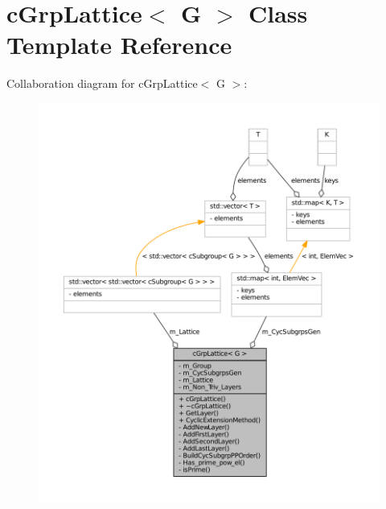 \hypertarget{classcGrpLattice}{
\section{c\-Grp\-Lattice$<$ \-G $>$ \-Class \-Template \-Reference}
\label{classcGrpLattice}
}


\-Collaboration diagram for c\-Grp\-Lattice$<$ \-G $>$\-:
\nopagebreak
\begin{figure}[H]
\begin{center}
\leavevmode
\includegraphics[width=350pt]{classcGrpLattice__coll__graph}
\end{center}
\end{figure}

